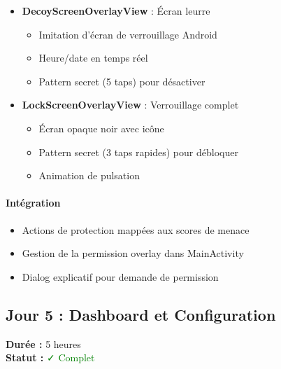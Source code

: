 \documentclass[11pt,a4paper]{article}
\begin{document}
\begin{itemize}
\begin{itemize}
        \item Double-tap pour désactiver
    \end{itemize}
    \item \textbf{DecoyScreenOverlayView} : Écran leurre
    \begin{itemize}
        \item Imitation d'écran de verrouillage Android
        \item Heure/date en temps réel
        \item Pattern secret (5 taps) pour désactiver
    \end{itemize}
    \item \textbf{LockScreenOverlayView} : Verrouillage complet
    \begin{itemize}
        \item Écran opaque noir avec icône
        \item Pattern secret (3 taps rapides) pour débloquer
        \item Animation de pulsation
    \end{itemize}
\end{itemize}

\paragraph{Intégration}
\begin{itemize}
    \item Actions de protection mappées aux scores de menace
    \item Gestion de la permission overlay dans MainActivity
    \item Dialog explicatif pour demande de permission
\end{itemize}

\subsection{Jour 5 : Dashboard et Configuration}

\textbf{Durée :} 5 heures \\
\textbf{Statut :} \textcolor{green}{✓ Complet}
\end{document}
